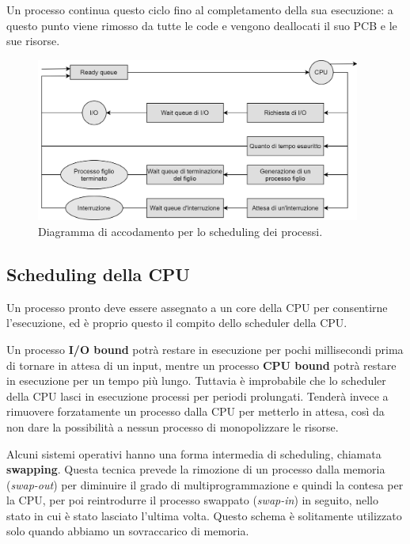         Un processo continua questo ciclo fino al completamento della sua esecuzione: a questo punto viene rimosso da tutte le code e vengono deallocati il suo PCB e le sue risorse.
        
        \begin{figure}[h]
            \centering
            \includegraphics[width=0.95\textwidth]{img/img8.png}
            \caption{Diagramma di accodamento per lo scheduling dei processi.}
            \label{fig:img8}
        \end{figure}
        
    \subsection{Scheduling della CPU}
        Un processo pronto deve essere assegnato a un core della CPU per consentirne l'esecuzione, ed è proprio questo il compito dello scheduler della CPU.
        
        Un processo \textbf{I/O bound} potrà restare in esecuzione per pochi millisecondi prima di tornare in attesa di un input, mentre un processo \textbf{CPU bound} potrà restare in esecuzione per un tempo più lungo. Tuttavia è improbabile che lo scheduler della CPU lasci in esecuzione processi per periodi prolungati. Tenderà invece a rimuovere forzatamente un processo dalla CPU per metterlo in attesa, così da non dare la possibilità a nessun processo di monopolizzare le risorse.
        
        Alcuni sistemi operativi hanno una forma intermedia di scheduling, chiamata \textbf{swapping}. Questa tecnica prevede la rimozione di un processo dalla memoria (\textit{swap-out}) per diminuire il grado di multiprogrammazione e quindi la contesa per la CPU, per poi reintrodurre il processo swappato (\textit{swap-in}) in seguito, nello stato in cui è stato lasciato l'ultima volta. Questo schema è solitamente utilizzato solo quando abbiamo un sovraccarico di memoria.
        
